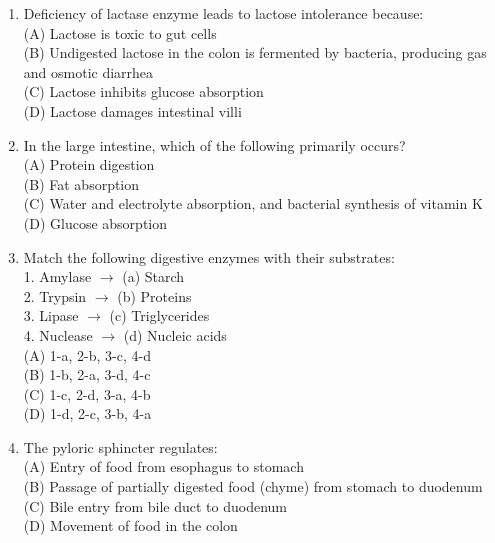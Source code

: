 \documentclass{article}
\begin{document}
\begin{enumerate}[label=Q\arabic*.]
\item Deficiency of lactase enzyme leads to lactose intolerance because:
\\(A) Lactose is toxic to gut cells
\\(B) Undigested lactose in the colon is fermented by bacteria, producing gas and osmotic diarrhea
\\(C) Lactose inhibits glucose absorption
\\(D) Lactose damages intestinal villi

\item In the large intestine, which of the following primarily occurs?
\\(A) Protein digestion
\\(B) Fat absorption
\\(C) Water and electrolyte absorption, and bacterial synthesis of vitamin K
\\(D) Glucose absorption

\item Match the following digestive enzymes with their substrates:\\
1. Amylase $\rightarrow$ (a) Starch\\
2. Trypsin $\rightarrow$ (b) Proteins\\
3. Lipase $\rightarrow$ (c) Triglycerides\\
4. Nuclease $\rightarrow$ (d) Nucleic acids
\\(A) 1-a, 2-b, 3-c, 4-d
\\(B) 1-b, 2-a, 3-d, 4-c
\\(C) 1-c, 2-d, 3-a, 4-b
\\(D) 1-d, 2-c, 3-b, 4-a

\item The pyloric sphincter regulates:
\\(A) Entry of food from esophagus to stomach
\\(B) Passage of partially digested food (chyme) from stomach to duodenum
\\(C) Bile entry from bile duct to duodenum
\\(D) Movement of food in the colon

\end{enumerate}
\end{document}
